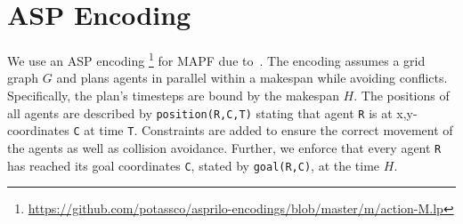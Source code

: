\section{ASP Encoding}

%
%
We use an ASP encoding%
%
\footnote{%
 \url{https://github.com/potassco/asprilo-encodings/blob/master/m/action-M.lp}}
%
for MAPF %
due to~\cite{geobotscsangso18a}.
The encoding assumes a grid graph \(G\) and plans agents in parallel within a makespan while avoiding conflicts.
%
Specifically,
the plan's timesteps are bound by the makespan $H$. %
%
The positions of all agents are described by \lstinline{position(R,C,T)} stating that agent \lstinline{R} is at x,y-coordinates \lstinline{C} at time \lstinline{T}.
Constraints are added to ensure the correct movement of the agents as well as collision avoidance.
%
%
%
%
%
%
%
Further,
we
enforce that every agent \lstinline{R} has reached its goal coordinates \lstinline{C}, stated by \lstinline{goal(R,C)},
at the time $H$.
%
%
%
%

